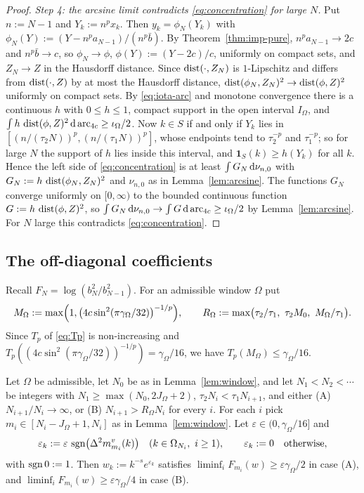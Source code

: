 \begin{proof}
\emph{Step 4: the arcsine limit contradicts \eqref{eq:concentration} for large $N$.} Put $n:=N-1$ and $Y_k:=n^px_k$.
Then $y_k=\phi_N(Y_k)$ with $\phi_N(Y):=(Y-n^pa_{N-1})/(n^p\bar b)$. By Theorem~\ref{thm:imp-pure},
$n^pa_{N-1}\to2c$ and $n^p\bar b\to c$, so $\phi_N\to\phi$, $\phi(Y):=(Y-2c)/c$, uniformly on compact sets, and
$Z_N\to Z$ in the Hausdorff distance. Since $\operatorname{dist}(\cdot,Z_N)$ is $1$-Lipschitz and differs from $\operatorname{dist}(\cdot,Z)$ by
at most the Hausdorff distance, $\operatorname{dist}(\phi_N,Z_N)^2\to\operatorname{dist}(\phi,Z)^2$ uniformly on compact sets. By
\eqref{eq:iota-arc} and monotone convergence there is a continuous $h$ with $0\le h\le1$, compact support in the open
interval $I_\Omega$, and $\int h\,\operatorname{dist}(\phi,Z)^2\,\mathrm{d}\operatorname{arc}_{4c}\ge\iota_\Omega/2$. Now $k\in S$ if and only if $Y_k$ lies in
$[(n/(\tau_2N))^p,(n/(\tau_1N))^p]$, whose endpoints tend to $\tau_2^{-p}$ and $\tau_1^{-p}$; so for large $N$ the
support of $h$ lies inside this interval, and $\mathbf 1_S(k)\ge h(Y_k)$ for all $k$. Hence the left side of
\eqref{eq:concentration} is at least $\int G_N\,\mathrm{d}\nu_{n,0}$ with $G_N:=h\,\operatorname{dist}(\phi_N,Z_N)^2$ and $\nu_{n,0}$ as in
Lemma~\ref{lem:arcsine}. The functions $G_N$ converge uniformly on $[0,\infty)$ to the bounded continuous function
$G:=h\,\operatorname{dist}(\phi,Z)^2$, so $\int G_N\,\mathrm{d}\nu_{n,0}\to\int G\,\mathrm{d}\operatorname{arc}_{4c}\ge\iota_\Omega/2$ by Lemma~\ref{lem:arcsine}. For
$N$ large this contradicts \eqref{eq:concentration}.
\end{proof}

\subsection{The off-diagonal coefficients}\label{sec:rough-b}
Recall $F_N=\log(b_N^2/b_{N-1}^2)$. For an admissible window $\Omega$ put
\[
  M_\Omega:=\max\Bigl(1,\bigl(4c\sin^2(\pi\gamma_\Omega/32)\bigr)^{-1/p}\Bigr),\qquad
  R_\Omega:=\max\bigl(\tau_2/\tau_1,\ \tau_2M_0,\ M_\Omega/\tau_1\bigr).
\]
Since $T_p$ of \eqref{eq:Tp} is non-increasing and $T_p((4c\sin^2(\pi\gamma_\Omega/32))^{-1/p})=\gamma_\Omega/16$, we have
$T_p(M_\Omega)\le\gamma_\Omega/16$.

\begin{theorem}\label{thm:rough-b}
Let $\Omega$ be admissible, let $N_0$ be as in Lemma~\ref{lem:window}, and let $N_1<N_2<\cdots$ be integers with
$N_1\ge\max(N_0,2J_\Omega+2)$, $\tau_2N_i<\tau_1N_{i+1}$, and either
\textup{(A)} $N_{i+1}/N_i\to\infty$, or \textup{(B)} $N_{i+1}>R_\Omega N_i$ for every $i$. For each $i$ pick
$m_i\in[N_i-J_\Omega+1,N_i]$ as in Lemma~\ref{lem:window}. Let $\varepsilon\in(0,\gamma_\Omega/16]$ and
\[
  \varepsilon_k:=\varepsilon\,\operatorname{sgn}\bigl(\Delta^2m^v_{m_i}(k)\bigr)\quad(k\in \Omega_{N_i},\ i\ge1),\qquad
  \varepsilon_k:=0\quad\text{otherwise},
\]
with $\operatorname{sgn}0:=1$. Then $w_k:=k^{-s}e^{\varepsilon_k}$ satisfies $\liminf_iF_{m_i}(w)\ge\varepsilon\gamma_\Omega/2$ in case
\textup{(A)}, and $\liminf_iF_{m_i}(w)\ge\varepsilon\gamma_\Omega/4$ in case \textup{(B)}.
\end{theorem}

